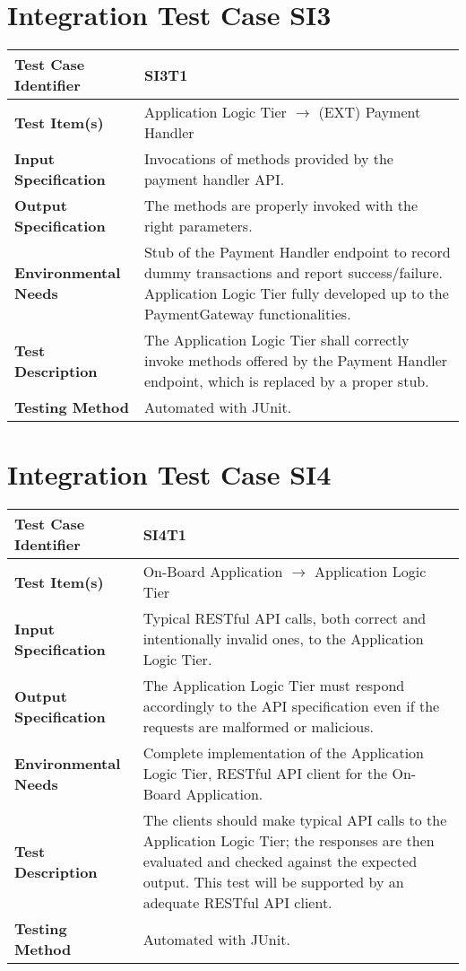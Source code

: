 \section{Integration Test Case SI3}

\begin{longtable}{p{} | p{}}
\hline
\textbf{Test Case Identifier} & SI3T1\\
\hline
\textbf{Test Item(s)} & Application Logic Tier $\rightarrow$ (EXT) Payment Handler \\
\hline
\textbf{Input Specification} & Invocations of methods provided by the payment handler API. \\
\hline
\textbf{Output Specification} & The methods are properly invoked with the right parameters. \\
\hline
\textbf{Environmental Needs} & Stub of the Payment Handler endpoint to record dummy transactions and report success/failure. Application Logic Tier fully developed up to the PaymentGateway functionalities.\\
\hline
\textbf{Test Description} & The Application Logic Tier shall correctly invoke methods offered by the Payment Handler endpoint, which is replaced by a proper stub. \\
\hline
\textbf{Testing Method} & Automated with JUnit. \\
\hline
\end{longtable}

\section{Integration Test Case SI4}

\begin{longtable}{p{} | p{}}
\hline
\textbf{Test Case Identifier} & SI4T1\\
\hline
\textbf{Test Item(s)} & On-Board Application $\rightarrow$ Application Logic Tier \\
\hline
\textbf{Input Specification} & Typical RESTful API calls, both correct and intentionally invalid ones, to the Application Logic Tier. \\
\hline
\textbf{Output Specification} & The Application Logic Tier must respond accordingly to the API specification even if the requests are malformed or malicious. \\
\hline
\textbf{Environmental Needs} & Complete implementation of the Application Logic Tier, RESTful API client for the On-Board Application. \\
\hline
\textbf{Test Description} & The clients should make typical API calls to the Application Logic Tier; the responses are then evaluated and checked against the expected output. This test will be supported by an adequate RESTful API client. \\
\hline
\textbf{Testing Method} & Automated with JUnit. \\
\hline
\end{longtable}

